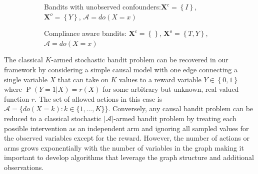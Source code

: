 \documentclass[11pt,a4paper,oneside]{book}
\newcommand{\actionspace}{\mathcal{A}}
\newcommand{\set}[1]{\left\{#1\right\}}
\renewcommand{\P}[1]{\operatorname{P}\left(#1\right)}
\renewcommand{\vec}[1]{\boldsymbol{#1}}
\theoremstyle{plain}
\theoremstyle{definition}
\begin{document}
\begin{figure}[h]
\centering
\begin{subfigure}[t]{0.49\textwidth}
\centering
\caption{Bandits with unobserved confounders:$\vec{X}^c=\set{I}$, $\vec{X}^o = \set{Y}$, $\actionspace = do(X=x)$}
\label{fig:confounded-causal-bandit-graph}
\end{subfigure}
\begin{subfigure}[t]{0.49\textwidth}
\centering
\caption{Compliance aware bandits: $\vec{X}^c=\set{}$, $\vec{X}^o = \set{T,Y}$, $\actionspace = do(X=x)$ }
\label{fig:imperfect-compliance-causal-bandit-graph}
\end{subfigure}
\caption{}
\label{fig:causal-bandit-version-confounded-compliance}
\end{figure}

The classical $K$-armed stochastic bandit problem can be recovered in our framework by considering a simple causal model with one edge connecting a single variable $X$ that can take on $K$ values to a reward variable $Y \in \set{0,1}$ where $\P{Y = 1|X} = r(X)$ for some arbitrary but unknown, real-valued function $r$. The set of allowed actions in this case is $\mathcal{A} = \{ do(X = k) \colon k \in \{1, \ldots, K\}\}$. Conversely, any causal bandit problem can be reduced to a classical stochastic $|\mathcal{A}|$-armed bandit problem by treating each possible intervention as an independent arm and ignoring all sampled values for the observed variables except for the reward. However, the number of actions or arms grows exponentially with the number of variables in the graph making it important to develop algorithms that leverage the graph structure and additional observations.
\end{document}
